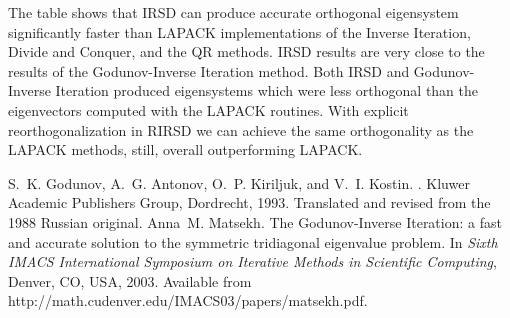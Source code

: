 \documentclass{report}
\begin{document}
\begin{table}[hbtp]
\centering
{}
\label{tbl:TestNew}
\end{table}
The table shows that IRSD can produce
accurate orthogonal eigensystem significantly faster than LAPACK
implementations of the Inverse Iteration, Divide and Conquer, and
the QR methods. IRSD results are very
close to the results of the Godunov-Inverse Iteration
method. Both IRSD and Godunov-Inverse
Iteration produced eigensystems which were less orthogonal than
the eigenvectors computed with the LAPACK routines. With
explicit reorthogonalization in RIRSD we can achieve the
same orthogonality as the LAPACK methods, still, overall
outperforming LAPACK.

\begin{thebibliography}{GAKK93}
S.~K. Godunov, A.~G. Antonov, O.~P. Kiriljuk, and V.~I. Kostin.
.
\newblock Kluwer Academic Publishers Group, Dordrecht, 1993.
\newblock Translated and revised from the 1988 Russian original.
Anna~M. Matsekh.
\newblock The {G}odunov-Inverse Iteration: {a} fast and accurate solution to
the symmetric tridiagonal eigenvalue problem.
\newblock In {\em Sixth IMACS International Symposium on Iterative
Methods in Scientific Computing}, Denver, CO, USA, 2003.
\newblock Available from http://math.cudenver.edu/IMACS03/papers/matsekh.pdf.
\end{thebibliography}
\end{document}
